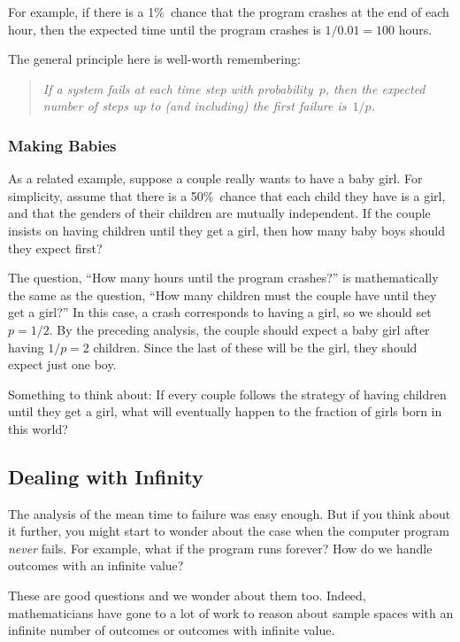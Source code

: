 For example, if there is a 1\%~chance that the program crashes at the
end of each hour, then the expected time until the program crashes is
$1 / 0.01 = 100$ hours.

The general principle here is well-worth remembering: 
\begin{quote}
\textit{If a system fails at each time step with probability~$p$, then
  the expected number of steps up to (and including) the first failure
  is~$1/p$.}
\end{quote}

\subsubsection{Making Babies}

As a related example, suppose a couple really wants to have a baby
girl.  For simplicity, assume that there is a 50\%~chance that each
child they have is a girl, and that the genders of their children are
mutually independent.  If the couple insists on having children until
they get a girl, then how many baby boys should they expect first?

The question, ``How many hours until the program crashes?'' is
mathematically the same as the question, ``How many children must the
couple have until they get a girl?''  In this case, a crash
corresponds to having a girl, so we should set $p = 1/2$.  By the
preceding analysis, the couple should expect a baby girl after having
$1/p = 2$ children.  Since the last of these will be the girl, they
should expect just one boy.

Something to think about: If every couple follows the strategy of having
children until they get a girl, what will eventually happen to the
fraction of girls born in this world?

\subsection{Dealing with Infinity}

The analysis of the mean time to failure was easy enough.  But if you
think about it further, you might start to wonder about the case when
the computer program \emph{never} fails.  For example, what if the
program runs forever?  How do we handle outcomes with an infinite
value?

These are good questions and we wonder about them too.  Indeed,
mathematicians have gone to a lot of work to reason about sample
spaces with an infinite number of outcomes or outcomes with infinite
value.

